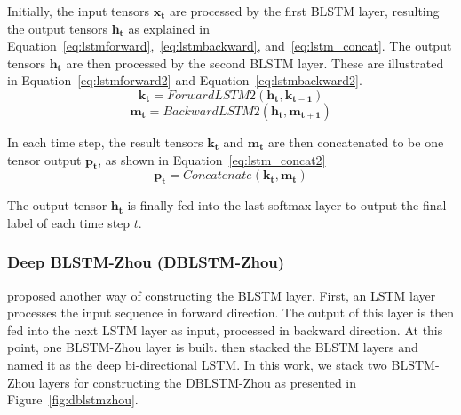 Initially, the input tensors $\mathbf{x_{t}}$ are processed by the first BLSTM layer, resulting the output tensors $\mathbf{h_{t}}$ as explained in Equation~\ref{eq:lstmforward},~\ref{eq:lstmbackward}, and~\ref{eq:lstm_concat}. The output tensors $\mathbf{h_{t}}$ are then processed by the second BLSTM layer. These are illustrated in Equation~\ref{eq:lstmforward2} and Equation~\ref{eq:lstmbackward2}.
\begin{equation}
\label{eq:lstmforward2}
\mathbf{k_{t}} = ForwardLSTM2(\mathbf{h_{t}}, \mathbf{k_{t-1}})
\end{equation}
\begin{equation}
\label{eq:lstmbackward2}
\mathbf{m_{t}} = BackwardLSTM2(\mathbf{h_{t}}, \mathbf{m_{t+1}})
\end{equation}

In each time step, the result tensors $\mathbf{k_{t}}$ and $\mathbf{m_{t}}$ are then concatenated to be one tensor output $\mathbf{p_{t}}$, as shown in Equation~\ref{eq:lstm_concat2}
\begin{equation}
\label{eq:lstm_concat2}
\mathbf{p_{t}} = Concatenate(\mathbf{k_{t}}, \mathbf{m_{t}})
\end{equation}

The output tensor $\mathbf{h_{t}}$ is finally fed into the last softmax layer to output the final label of each time step $t$.

\subsubsection{Deep BLSTM-Zhou (DBLSTM-Zhou)}
\cite{zhou2015end} proposed another way of constructing the BLSTM layer. First, an LSTM layer processes the input sequence in forward direction. The output of this layer is then fed into the next LSTM layer as input, processed in backward direction. At this point, one BLSTM-Zhou layer is built. \cite{zhou2015end} then stacked the BLSTM layers and named it as the deep bi-directional LSTM. In this work, we stack two BLSTM-Zhou layers for constructing the DBLSTM-Zhou as presented in Figure~\ref{fig:dblstmzhou}.


